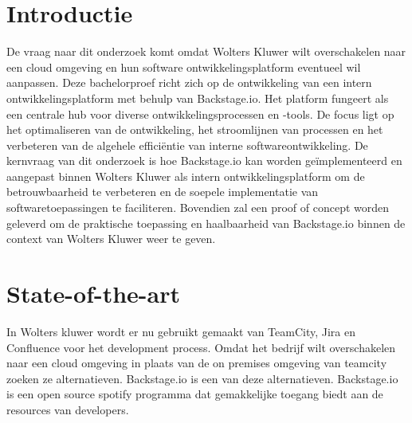 
\section{Introductie}%
\label{sec:introductie}

De vraag naar dit onderzoek komt omdat Wolters Kluwer wilt overschakelen naar een cloud omgeving en hun software ontwikkelingsplatform eventueel wil aanpassen. Deze bachelorproef richt zich op de ontwikkeling van een intern ontwikkelingsplatform met behulp van Backstage.io. Het platform fungeert als een centrale hub voor diverse ontwikkelingsprocessen en -tools. De focus ligt op het optimaliseren van de ontwikkeling, het stroomlijnen van processen en het verbeteren van de algehele efficiëntie van interne softwareontwikkeling. 
De kernvraag van dit onderzoek is hoe Backstage.io kan worden geïmplementeerd en aangepast binnen Wolters Kluwer als intern ontwikkelingsplatform om de betrouwbaarheid te verbeteren en de soepele implementatie van softwaretoepassingen te faciliteren. Bovendien zal een proof of concept worden geleverd om de praktische toepassing en haalbaarheid van Backstage.io binnen de context van Wolters Kluwer weer te geven.







\section{State-of-the-art}%
\label{sec:state-of-the-art}

\cite{CK_BackstageGithub}
\cite{Backstage_Docs}

In Wolters kluwer wordt er nu gebruikt gemaakt van TeamCity, Jira en Confluence voor het development process. Omdat het bedrijf wilt overschakelen naar een cloud omgeving in plaats van de on premises omgeving van teamcity zoeken ze alternatieven. Backstage.io is een van deze alternatieven. Backstage.io is een open source spotify programma dat gemakkelijke toegang biedt aan de resources van developers. 

